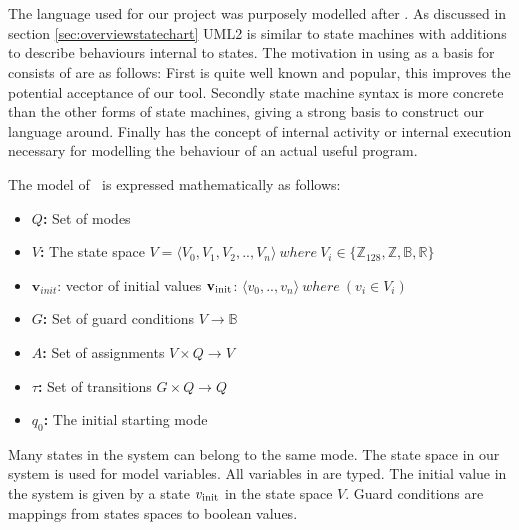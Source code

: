 \section{\plcchart}
\label{sec:statechartsem}

The language used for our project was purposely modelled after
 \cite{UML2}. As discussed 
in section \ref{sec:overviewstatechart} UML2 is similar to state 
machines with additions to describe behaviours internal to states.
The motivation in using  \cite{UML2}
as a basis for \emphasize{\plcchart} consists of are as follows: 
First  \cite{UML2}
is quite well known and popular, this improves the potential acceptance
of our tool. Secondly \cite{UML2}
state machine syntax is more concrete than the other forms of state
machines, giving a strong basis to construct our language around.
Finally \cite{UML2} has the
concept of internal activity or internal execution necessary for modelling
the behaviour of an actual useful program.

The model of \plcchart $\:$ is expressed mathematically as follows:

\begin{definition}
	\plcchart
	
\begin{itemize}
	\item \textbf{$Q$:} Set of modes
	\item \textbf{$V$:} The state space $V = \langle V_0,V_1,V_2,..,V_n \rangle \: where \: V_{i}\in \lbrace \mathbb{Z}_{128}, \mathbb{Z}, \mathbb{B}, \mathbb{R} \rbrace$
	\item $\mathbf{v}_{init}$: vector of initial values $\mathbf{v}_{\mbox{\scriptsize init}}$: $\langle v_0,..,v_n \rangle \: where \: (v_i \in V_i)$
	\item \textbf{$G$:} Set of guard conditions $V \rightarrow \mathbb{B}$
	\item \textbf{$A$:} Set of assignments $V \times Q \rightarrow V$
	\item \textbf{$\tau$:} Set of transitions $G \times Q \rightarrow Q$
	\item \textbf{$q_0$:} The initial starting mode
\end{itemize}
\end{definition}

Many states in the system can belong to the same mode. The state space in our
system is used for model variables. All variables in \emphasize{\plcchart}
are typed. The initial value in the system is given by a state $v_{\mbox{\scriptsize init}}$ in
the state space $V$.  Guard conditions are mappings from states spaces
to boolean values.

